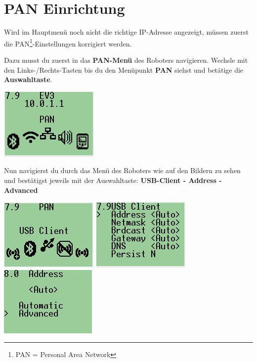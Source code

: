 \documentclass[
	12pt,
	colorbacktitle,
	accentcolor=tud1c,
	draft,
	twoside,
	german
]{tudexercise}
\begin{document}
	\section{PAN Einrichtung}
	\label{sec:pan}
			Wird im Hauptmenü noch nicht die richtige IP-Adresse angezeigt, müssen zuerst die PAN\footnote{PAN = Personal Area Network}-Einstellungen korrigiert werden.
		
		\begin{enumerate}	
		\begin{minipage}{.45\textwidth}
		\item Dazu musst du zuerst in das \textbf{PAN-Menü} des Roboters navigieren. Wechsle mit den Links-/Rechts-Tasten bis du den Menüpunkt \textbf{PAN} siehst und betätige die \textbf{Auswahltaste}.
		\end{minipage}
		\hfill
		\begin{minipage}{.45\textwidth}
		\includegraphics[width=.8\textwidth]{img/ev3_pan.png}
		\end{minipage}
		
		\item Nun navigierst du durch das Menü des Roboters wie auf den Bildern zu sehen und bestätigst jeweils mit der Auswahltaste: \textbf{USB-Client - Address - Advanced}
		
		\includegraphics[width=.3\textwidth]{img/ev3_pan_usb.png}
		\includegraphics[width=.3\textwidth]{img/ev3_pan_usb_address.png}		
		\includegraphics[width=.3\textwidth]{img/ev3_pan_usb_advanced.png}
		

\end{enumerate}
\end{document}

